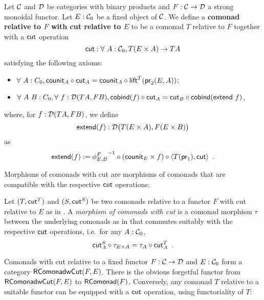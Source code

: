\documentclass[conference,10pt]{IEEEtran}
\newcommand{\fat}[1]{\textbf{#1}}
\begin{document}
\begin{definition}\label{def:rel_comonad_with_cut}
 Let $\C$ and $\D$ be categories with binary products and $F:\C\to\D$ a strong monoidal functor. Let $E:\C_0$ be a fixed object of $\C$.
 We define a \fat{comonad relative to $F$ with cut relative to $E$} to be a comonad $T$ relative to $F$ together with a $\cut$ operation 
    \[ \cut : \forall~A:\C_0, T(E\times A) \to TA \]
 satisfying the following axioms:
  \begin{itemize}
   \item $\forall~A:C_0, \comp{\cut_A}{\counit_A} = \comp{\lift^T(\pr_2(E,A))}{\counit_{A}}$;
   \item $\forall~A~B:C_0,\forall~f:\D(TA,FB), \\ \comp{\cut_A}{\cobind(f)} = \comp{\cobind(\extend~f)}{\cut_B}$,
  \end{itemize}

  \noindent
  where, for $f:\D(TA,FB)$, we define \[\extend(f) : \D\bigl(T(E\times A),F(E\times B)\bigr)\] as
       \[ \extend(f) := \comp{\comp{\langle T(\pr_1) , \cut \rangle}{(\counit_E\times f)}}{{\phi^{F}_{E,B}}^{-1}} \enspace . \]
  
\end{definition}

Morphisms of comonads with cut are morphisms of comonads that are compatible with the respective $\cut$ operations:

\begin{definition}\label{def:morphism_comonad_cut}
 Let $(T,\cut^T)$ and $(S,\cut^S)$ be two comonads relative to a functor $F$ with cut relative to $E$ as in .
 A \emph{morphism of comonads with cut} is a comonad morphism $\tau$ between the underlying comonads as in  that 
 commutes suitably with the respective $\cut$ operations, i.e.\ for any $A : \C_0$,
  \[ \comp{\tau_{E \times A}}{\cut^S_A}  = \comp{\cut^T_A}{\tau_A} \enspace . \]
\end{definition}


Comonads with cut relative to a fixed functor $F:\C\to\D$ and $E:\C_0$ form a category $\RComonadWC(F,E)$.
There is the obvious forgetful functor from $\RComonadWC(F,E)$ to $\RComonad(F)$.
Conversely, any comonad $T$ relative to a suitable functor can be equipped with a $\cut$ operation, using functoriality of $T$:
\end{document}
